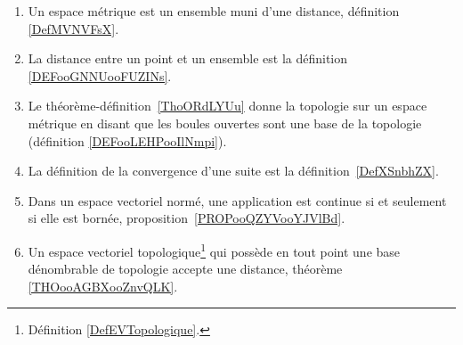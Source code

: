 
\begin{enumerate}
	\item
	      Un espace métrique est un ensemble muni d'une distance, définition \ref{DefMVNVFsX}.
	\item
	      La distance entre un point et un ensemble est la définition \ref{DEFooGNNUooFUZINs}.
	\item
	      Le théorème-définition~\ref{ThoORdLYUu} donne la topologie sur un espace métrique en disant que les boules ouvertes sont une base de la topologie (définition \ref{DEFooLEHPooIlNmpi}).
	\item
	      La définition de la convergence d'une suite est la définition~\ref{DefXSnbhZX}.
	\item
	      Dans un espace vectoriel normé, une application est continue si et seulement si elle est bornée, proposition~\ref{PROPooQZYVooYJVlBd}.
	\item
	      Un espace vectoriel topologique\footnote{Définition \ref{DefEVTopologique}.} qui possède en tout point une base dénombrable de topologie accepte une distance, théorème \ref{THOooAGBXooZnvQLK}.
\end{enumerate}
